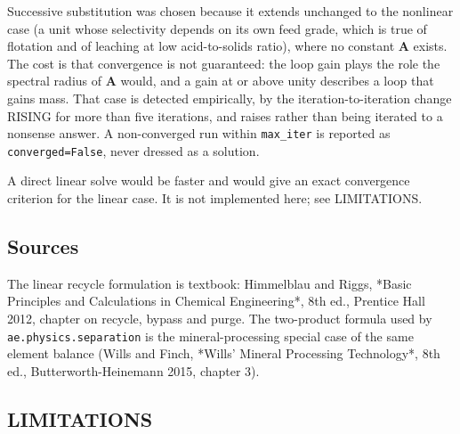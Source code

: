 \documentclass[10pt,a4paper,twoside]{report}
\begin{document}
Successive substitution was chosen because it extends unchanged to the nonlinear case (a unit whose selectivity depends on its own feed grade, which is true of flotation and of leaching at low acid-to-solids ratio), where no constant $\mathbf{A}$ exists. The cost is that convergence is not guaranteed: the loop gain plays the role the spectral radius of $\mathbf{A}$ would, and a gain at or above unity describes a loop that gains mass. That case is detected empirically, by the iteration-to-iteration change RISING for more than five iterations, and raises rather than being iterated to a nonsense answer. A non-converged run within \texttt{max\_iter} is reported as \texttt{converged=False}, never dressed as a solution.

A direct linear solve would be faster and would give an exact convergence criterion for the linear case. It is not implemented here; see LIMITATIONS.

\subsection*{Sources}

The linear recycle formulation is textbook: Himmelblau and Riggs, *Basic Principles and Calculations in Chemical Engineering*, 8th ed., Prentice Hall 2012, chapter on recycle, bypass and purge. The two-product formula used by \texttt{ae.physics.separation} is the mineral-processing special case of the same element balance (Wills and Finch, *Wills' Mineral Processing Technology*, 8th ed., Butterworth-Heinemann 2015, chapter 3).

\subsection*{LIMITATIONS}
\end{document}
